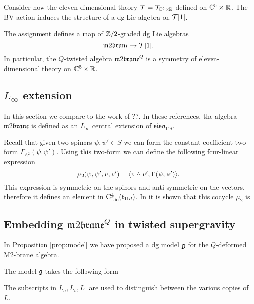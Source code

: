 \documentclass[11pt]{amsart}
\def\m2{\mathfrak{m}2\mathfrak{brane}}
\def\siso{\mathfrak{siso}}
\def\lie#1{\ensuremath{\mathfrak{#1}}}
\begin{document}
Consider now the eleven-dimensional theory $\mathcal T = \mathcal T_{\mathbb C^5 \times \mathbb R}$ defined on $\mathbb C^5 \times \mathbb R$. 
The BV action induces the structure of a dg Lie algebra on $\mathcal T[1]$. 

\begin{prop}
The assignment
 defines a map of $\mathbb Z/2$-graded dg Lie algebras 
\[
\m2 \to \cT[1] .
\]
In particular, the $Q$-twisted algebra $\m2^Q$ is a symmetry of eleven-dimensional theory on $\mathbb C^5 \times \mathbb R$. 
\end{prop}


\subsection{$L_\infty$ extension}

In this section we compare to the work of ??.
In these references, the algebra $\m2$ is defined as an $L_\infty$  
central extension of $\siso_{11d}$. 

Recall that given two spinors $\psi, \psi' \in S$ we can form the constant coefficient two-form $\Gamma_{\wedge^2} (\psi, \psi')$. 
Using this two-form we can define the following four-linear expression
\[
\mu_2 (\psi, \psi',v,v') = \langle v \wedge v', \Gamma(\psi, \psi')\rangle .
\]
This expression is symmetric on the spinors and anti-symmetric on the vectors, therefore it defines an element in ${\rm C}_{{\rm Lie}}^4(\mathfrak t_{11d})$. 
In \cite{??} it is shown that this cocycle $\mu_2$ is 

\subsection{Embedding $\m2^Q$ in twisted supergravity} 

In Proposition \ref{prop:model} we have proposed a dg model $\mathfrak g$ for the $Q$-deformed M2-brane algebra. 

The model $\mathfrak g$ takes the following form
\beqn 
{}
\eeqn
The subscripts in $L_a, L_b, L_c$ are used to distinguish between the various copies of $L$.
\end{document}
